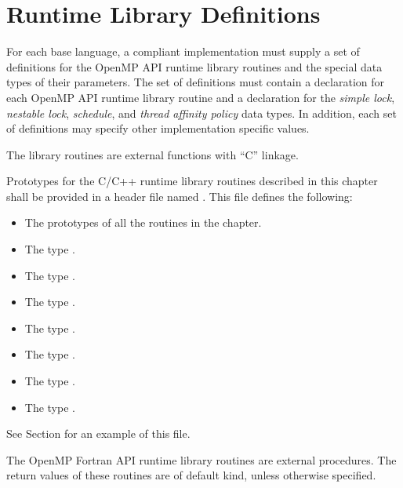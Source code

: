\section{Runtime Library Definitions}
\label{sec:runtime library definitions}
For each base language, a compliant implementation must supply a set of definitions for 
the OpenMP API runtime library routines and the special data types of their parameters. 
The set of definitions must contain a declaration for each OpenMP API runtime library 
routine and a declaration for the \emph{simple lock}, \emph{nestable lock}, \emph{schedule}, and \emph{thread affinity
policy} data types. In addition, each set of definitions may specify other implementation 
specific values.

\ccppspecificstart
The library routines are external functions with ``C'' linkage.

Prototypes for the C/C++ runtime library routines described in this chapter shall be 
provided in a header file named . This file defines the following: 

\begin{itemize}
\item The prototypes of all the routines in the chapter. 

\item The type . 

\item The type .

\item The type . 

\item The type .

\item The type .

\item The type .

\item The type .

\end{itemize}

See Section  for an example of this file.
\ccppspecificend

\fortranspecificstart
The OpenMP Fortran API runtime library routines are external procedures. The return 
values of these routines are of default kind, unless otherwise specified.

